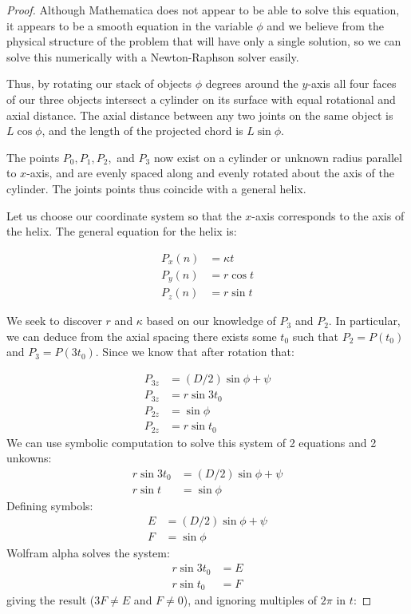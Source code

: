 \documentclass[11pt]{article}
\begin{document}
\begin{proof}
    Although Mathematica does not appear to be able to solve this equation, it appears
    to be a smooth equation in the variable $\phi$ and we believe from the physical
    structure of the problem that will have only a single solution, so we can
    solve this numerically with a Newton-Raphson solver easily.
    
    Thus, by rotating our stack of objects $\phi$ degrees around the $y$-axis 
    all four faces of our three objects intersect a cylinder on its surface with
    equal rotational and axial distance. The axial distance between any two joints
    on the same object is $L \cos{\phi}$,
    and the length of the projected chord is $L \sin{\phi}$.

    The points $P_0,P_1,P_2,$ and $P_3$ now exist on a cylinder or unknown radius parallel
    to $x$-axis, and are evenly spaced along and evenly rotated about the axis of the
    cylinder. The joints points thus coincide with a general helix.

    Let us choose our coordinate system so that the $x$-axis corresponds to the
    axis of the helix. The general equation for the helix is:

\begin{align*}
    P_x(n) &= \kappa  t  \\
    P_y(n) &= r \cos{t} \\
   P_z(n) &= r \sin{t}
\end{align*}

We seek to discover $r$ and $\kappa$ based on our knowledge of $P_3$ and $P_2$.
In particular, we can deduce from the axial spacing there exists some $t_0$ such
that $P_2 = P(t_0)$ and $P_3 = P(3t_0)$.
Since we know that after rotation that:

  \begin{align*}
    P_{3z} &= (D/2) \sin{\phi + \psi} \\
    P_{3z} &= r\sin{3t_0} \\
    P_{2z} &= \sin{\phi} \\
    P_{2z} &= r\sin{t_0}
  \end{align*}
  We can use symbolic computation to solve this system of 2 equations and 2 unkowns:
  \begin{align*}
    r\sin{3t_0} &= (D/2) \sin{\phi + \psi} \\
    r\sin{t} &= \sin{\phi}
  \end{align*}
  Defining symbols:
  \begin{align*}
    E &= (D/2) \sin{\phi + \psi} \\
    F &= \sin{\phi}
  \end{align*}
  Wolfram alpha solves the system:
  \begin{align*}  
    r\sin{3t_0} &= E \\
    r\sin{t_0} &= F
  \end{align*}
  giving the result ($3F \neq E$ and $F \neq 0$), and ignoring multiples of $2\pi$ in $t$:


\end{proof}
\end{document}
